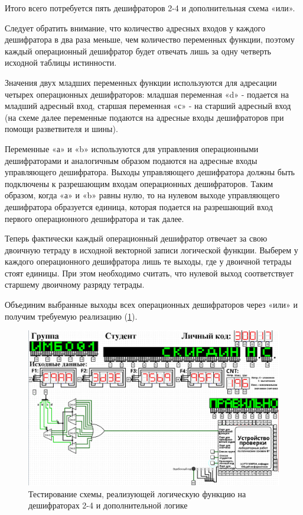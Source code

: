 \documentclass[14pt, a4paper]{extreport}
\begin{document}
Итого всего потребуется пять дешифраторов 2-4 и дополнительная схема
«или».

Следует обратить внимание, что количество адресных входов у каждого дешифратора в два раза меньше, чем количество переменных функции, поэтому каждый операционный дешифратор будет отвечать лишь за одну четверть исходной таблицы истинности.

Значения двух младших переменных функции используются для адресации четырех операционных дешифраторов: младшая переменная «d» - подается на младший адресный вход, старшая переменная «с» - на старший адресный вход (на схеме далее переменные подаются на адресные входы дешифраторов при помощи разветвителя и шины).

Переменные «а» и «b» используются для управления операционными дешифраторами и аналогичным образом подаются на адресные входы управляющего дешифратора. Выходы управляющего дешифратора должны быть подключены к разрешающим входам операционных дешифраторов. Таким образом, когда «а» и «b» равны нулю, то на нулевом выходе управляющего дешифратора образуется единица, которая подается на разрешающий вход первого операционного дешифратора и так далее.

Теперь фактически каждый операционный дешифратор отвечает за свою двоичную тетраду в исходной векторной записи логической функции. Выберем у каждого операционного дешифратора лишь те выходы, где у двоичной тетрады стоят единицы. При этом необходимо считать, что нулевой выход соответствует старшему двоичному разряду тетрады.

Объединим выбранные выходы всех операционных дешифраторов через «или» и получим требуемую реализацию (\cref{fig:decoder-2-4}).

\begin{figure}[H]
	\caption{Тестирование схемы, реализующей логическую функцию на дешифраторах 2-4 и дополнительной логике}
	\label{fig:decoder-2-4}
	\includegraphics[width=\textwidth]{decoder-2-4}
\end{figure}
\end{document}
